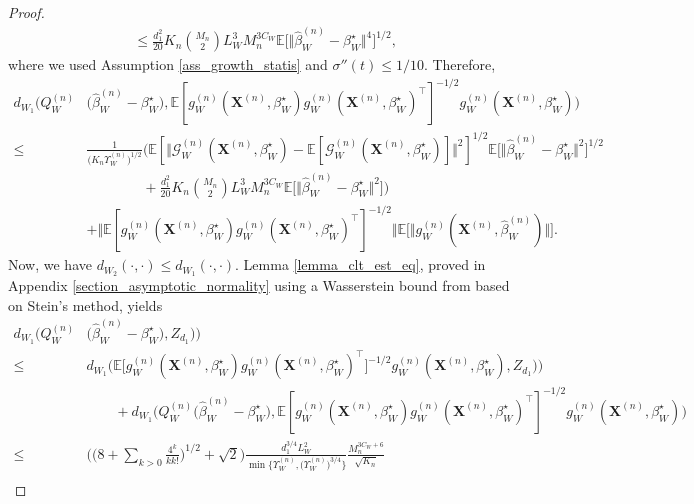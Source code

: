\documentclass{article}
\begin{document}
\begin{proof}
\begin{align*}
    & \leq  \frac{d_1^2}{20} K_n \binom{M_n}{2}  L_W^3 M_n^{3C_W} \mathbb{E}\big[ \Vert \hat{\beta}_W^{(n)}-\beta_W^{\star}\Vert^4 \big]^{1/2},
\end{align*}
where we used Assumption \ref{ass_growth_statis} and $\sigma''(t)\leq 1/10$. Therefore,
\begin{align*}
    d_{W_1}\Big(Q_W^{(n)} &\big( \hat{\beta}_W^{(n)}-\beta_W^{\star}\big) , \mathbb{E}[g_W^{(n)}(\mathbf{X}^{(n)},\beta_W^{\star})g_W^{(n)}(\mathbf{X}^{(n)},\beta_W^{\star})^{\top}]^{-1/2} g_W^{(n)}(\mathbf{X}^{(n)},\beta_W^{\star}) \Big) \\
     \leq & \frac{1}{\big( K_n\Upsilon_W^{(n)}\big)^{1/2}} \bigg( \mathbb{E}[ \Vert \mathcal{G}_W^{(n)}(\mathbf{X}^{(n)},\beta_W^{\star}) - \mathbb{E}[\mathcal{G}_W^{(n)}(\mathbf{X}^{(n)},\beta_W^{\star})] \Vert^2 ]^{1/2} \mathbb{E}\big[ \Vert \hat{\beta}_W^{(n)} - \beta_W^{\star} \Vert^2 ]^{1/2} \\
    & \qquad \qquad+ \frac{d_1^2}{20} K_n \binom{M_n}{2}  L_W^3 M_n^{3C_W} \mathbb{E}\big[ \Vert \hat{\beta}_W^{(n)}-\beta_W^{\star}\Vert^2 \big] \bigg) \\
    & +\Vert \mathbb{E}[g_W^{(n)}(\mathbf{X}^{(n)},\beta_W^{\star})g_W^{(n)}(\mathbf{X}^{(n)},\beta_W^{\star})^{\top}]^{-1/2} \Vert \mathbb{E}\big[\Vert g_W^{(n)}(\mathbf{X}^{(n)},\hat{\beta}_W^{(n)}) \Vert \big].
\end{align*}
Now, we have $d_{W_2}(\cdot,\cdot) \leq d_{W_1}(\cdot,\cdot) $.   Lemma \ref{lemma_clt_est_eq},  proved in Appendix \ref{section_asymptotic_normality}  using a Wasserstein bound  from \cite{bonis2020stein}  based on Stein's method, yields
\begin{align*}
    d_{W_1}\Big(Q_W^{(n)} &\big( \hat{\beta}_W^{(n)}-\beta_W^{\star}\big), {Z}_{d_1}) \Big) \\
     \leq & d_{W_1}\Big( \mathbb{E}\big[g_W^{(n)}(\mathbf{X}^{(n)},\beta_W^{\star})g_W^{(n)}(\mathbf{X}^{(n)},\beta_W^{\star})^{\top} \big]^{-1/2} g_W^{(n)}(\mathbf{X}^{(n)},\beta_W^{\star}) , {Z}_{d_1})  \Big) \\
    & \qquad + d_{W_1}\Big(Q_W^{(n)} \big( \hat{\beta}_W^{(n)}-\beta_W^{\star}\big) , \mathbb{E}[g_W^{(n)}(\mathbf{X}^{(n)},\beta_W^{\star})g_W^{(n)}(\mathbf{X}^{(n)},\beta_W^{\star})^{\top}]^{-1/2} g_W^{(n)}(\mathbf{X}^{(n)},\beta_W^{\star}) \Big) \\
    \leq & \bigg(\bigg( 8+\sum_{k>0} \frac{4^k}{kk!} \bigg)^{1/2} + \sqrt{2}\bigg) \frac{d_1^{3/4} L_W^2}{\min\big\{\Upsilon_W^{(n)},\big(\Upsilon_W^{(n)}\big)^{3/4}\big\}} \frac{M_n^{3C_W+6} }{\sqrt{K_n}} \\

\end{align*}
\end{proof}
\end{document}
